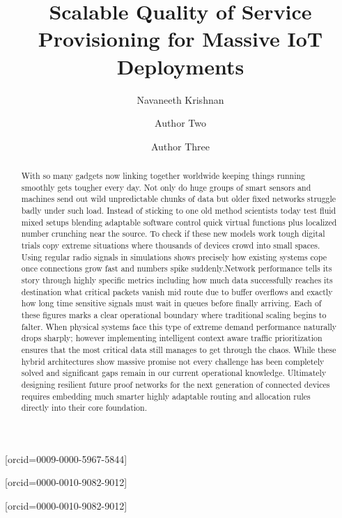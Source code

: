 \documentclass[a4paper,fleqn]{cas-dc}
\numberwithin{equation}{section}
\begin{document}
\sloppy
\setlength{\emergencystretch}{3em}

\let\WriteBookmarks\relax
\def\floatpagepagefraction{1}
\def\textpagefraction{.001}


\title[mode=title]{Scalable Quality of Service Provisioning for Massive IoT Deployments}

\author[1]{Navaneeth Krishnan}[orcid=0009-0000-5967-5844]

\author[1]{Author Two}[orcid=0000-0010-9082-9012]
\cormark[1]

\author[1]{Author Three}[orcid=0000-0010-9082-9012]

\address[1]{School of Computer Science and Engineering, VIT AP University, Amaravathi, Andhra Pradesh, India}


\begin{abstract}
With so many gadgets now linking together worldwide keeping things running smoothly gets tougher every day. Not only do huge groups of smart sensors and machines send out wild unpredictable chunks of data but older fixed networks struggle badly under such load. Instead of sticking to one old method scientists today test fluid mixed setups blending adaptable software control quick virtual functions plus localized number crunching near the source. To check if these new models work tough digital trials copy extreme situations where thousands of devices crowd into small spaces. Using regular radio signals in simulations shows precisely how existing systems cope once connections grow fast and numbers spike suddenly.Network performance tells its story through highly specific metrics including how much data successfully reaches its destination what critical packets vanish mid route due to buffer overflows and exactly how long time sensitive signals must wait in queues before finally arriving. Each of these figures marks a clear operational boundary where traditional scaling begins to falter. When physical systems face this type of extreme demand performance naturally drops sharply; however implementing intelligent context aware traffic prioritization ensures that the most critical data still manages to get through the chaos. While these hybrid architectures show massive promise not every challenge has been completely solved and significant gaps remain in our current operational knowledge. Ultimately designing resilient future proof networks for the next generation of connected devices requires embedding much smarter highly adaptable routing and allocation rules directly into their core foundation.
\end{abstract}
\end{document}
